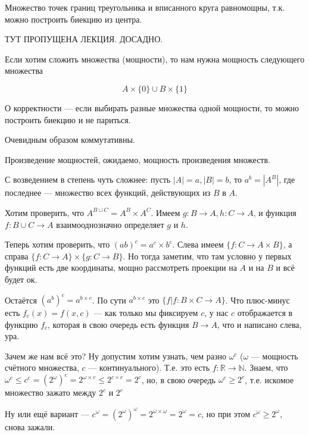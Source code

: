 \begin{example}
	Множество точек границ треугольника и вписанного круга равномощны, т.к. можно построить биекцию из центра. 
\end{example}

ТУТ ПРОПУЩЕНА ЛЕКЦИЯ. ДОСАДНО.


Если хотим сложить множества (мощности), то нам нужна мощность следующего множества

{
\large
$$
A \times \{0\} \cup B \times \{1\}
$$
}

О корректности --- если выбирать разные множества одной мощности, то можно построить биекцию и не париться.

Очевидным образом коммутативны.

Произведение мощностей, ожидаемо, мощность произведения множеств.

С возведением в степень чуть сложнее: пусть $|A| = a, |B| = b$, то $a^b = |A^B|$, где последнее --- множество всех функций, действующих из $B$ в $A$.

Хотим проверить, что $A^{B \sqcup C} = A^B \times A^C$. Имеем $g : B \to A, h : C \to A$, и функция $f : B \cup C \to A$ взаимооднозначно определяет $g $ и $h$.

Теперь хотим проверить, что $(ab)^c = a^c \times b^c$. Слева имеем $\{f : C \to A \times B\}$, а справа $\{ f : C \to A  \} \times \{g : C \to B\}$. Но тогда заметим, что там условно у первых функций есть две координаты, мощно рассмотреть проекции  на $A$ и на $B$ и всё будет ок.

Остаётся $(a ^ b)^c = a^{b \times c}$. По сути $a^{b \times c}$ это $\{f | f : B \times C \to A\}$. Что плюс-минус есть $f_c(x) = f(x, c)$ --- как только мы фиксируем $c$, у нас $c$ отображается в функцию $f_c$, которая в свою очередь есть функция $B \to A$, что и написано слева, ура.

Зачем же нам всё это? Ну допустим хотим узнать, чем разно $\omega^c$ ($\omega $ --- мощность счётного множества, $c$ --- континуального). Т.е. это есть $f : \mathbb{R} \to \mathbb{N}$. Знаем, что $\omega^c \le c^c = (2^{\omega})^c = 2^{\omega \times c} \le 2^{c \times c} = 2^{c}$, но, в свою очередь $\omega ^ c \ge 2^c$, т.е. искомое множество зажато между $2^c$ и $2^c$

Ну или ещё вариант --- $c^{\omega} = (2^{\omega})^{\omega} = 2^{\omega \times \omega} = 2^{\omega} = c$, но при этом $c^{\omega} \ge 2^{\omega}$, снова зажали.

